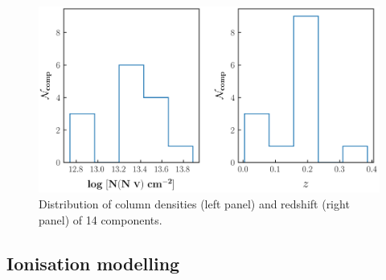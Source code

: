 \begin{figure}
    \centering
    \includegraphics[width=\linewidth]{Figures/NV_distribution_survey.png}
    \caption{Distribution of column densities (left panel) and redshift (right panel) of 14  components.}
    \label{fig:NV_distribution}
\end{figure}



\subsection{Ionisation modelling}







